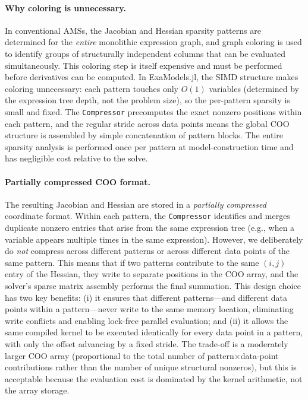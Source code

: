\documentclass[11pt]{article}
\begin{document}
\paragraph{Why coloring is unnecessary.}
In conventional AMSs, the Jacobian and Hessian sparsity patterns are determined for the \emph{entire} monolithic expression graph, and graph coloring is used to identify groups of structurally independent columns that can be evaluated simultaneously. This coloring step is itself expensive and must be performed before derivatives can be computed. In ExaModels.jl, the SIMD structure makes coloring unnecessary: each pattern touches only $O(1)$ variables (determined by the expression tree depth, not the problem size), so the per-pattern sparsity is small and fixed. The \texttt{Compressor} precomputes the exact nonzero positions within each pattern, and the regular stride across data points means the global COO structure is assembled by simple concatenation of pattern blocks. The entire sparsity analysis is performed once per pattern at model-construction time and has negligible cost relative to the solve.

\paragraph{Partially compressed COO format.}
The resulting Jacobian and Hessian are stored in a \emph{partially compressed} coordinate format. Within each pattern, the \texttt{Compressor} identifies and merges duplicate nonzero entries that arise from the same expression tree (e.g., when a variable appears multiple times in the same expression). However, we deliberately do \emph{not} compress across different patterns or across different data points of the same pattern. This means that if two patterns contribute to the same $(i,j)$ entry of the Hessian, they write to separate positions in the COO array, and the solver's sparse matrix assembly performs the final summation. This design choice has two key benefits: (i) it ensures that different patterns---and different data points within a pattern---never write to the same memory location, eliminating write conflicts and enabling lock-free parallel evaluation; and (ii) it allows the same compiled kernel to be executed identically for every data point in a pattern, with only the offset advancing by a fixed stride. The trade-off is a moderately larger COO array (proportional to the total number of pattern$\times$data-point contributions rather than the number of unique structural nonzeros), but this is acceptable because the evaluation cost is dominated by the kernel arithmetic, not the array storage.
\end{document}
